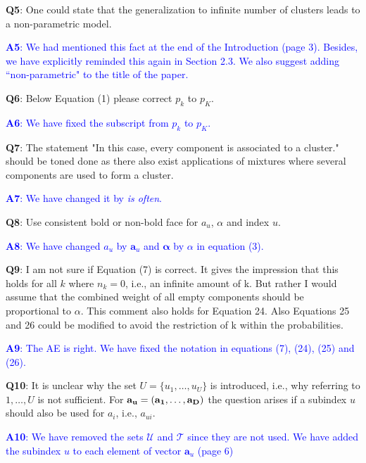 \documentclass[]{article}
\begin{document}
		\vspace{3mm}
	\textbf{Q5}:  One could state that the generalization to infinite number of clusters leads to a non-parametric model.

	\textcolor{blue}{  
	\textbf{A5}: We had mentioned this fact at the end of the Introduction (page 3). Besides, we have explicitly reminded this again in Section 2.3. We also suggest adding ``non-parametric" to the title of the paper.
	} 

		\vspace{3mm}
	\textbf{Q6}:  Below Equation (1) please correct $p_k$ to $p_K$.

	\textcolor{blue}{  
	\textbf{A6}: We have fixed the subscript from $p_k$ to $p_K$.
	} 

		\vspace{3mm}
	\textbf{Q7}:  The statement "In this case, every component is associated to a cluster." should be toned done as there also exist applications of mixtures where several components are used to form a cluster.
	
	\textcolor{blue}{  
	\textbf{A7}: We have changed it by \textit{is often}.
	} 
	
		\vspace{3mm}
	\textbf{Q8}:  Use consistent bold or non-bold face for $a_u$, $\alpha$ and index $u$.

	\textcolor{blue}{  
	\textbf{A8}: We have changed $a_u$ by $\mathbf{a}_u$ and $\boldsymbol{\alpha}$ by $\alpha$ in equation (3).
	} 
	
		\vspace{3mm}
	\textbf{Q9}: I am not sure if Equation (7) is correct. It gives the impression that this holds for all $k$ where $n_k = 0$, i.e., an infinite amount of k. But rather I would assume that the combined weight of all empty components should be proportional to $\alpha$. This comment also holds for Equation 24. Also Equations 25 and 26 could be modified to avoid the restriction of k within the probabilities.

	\textcolor{blue}{  
	\textbf{A9}: The AE is right. We have fixed the notation in equations (7), (24), (25) and (26).
	} 

	
	\vspace{3mm}
	\textbf{Q10}:  It is unclear why the set $U = \{u_1, \ldots, u_U\}$ is introduced, i.e., why referring to $1, \ldots, U$ is not sufficient. For $\bf{a}_u = (a_1, \ldots, a_D)$ the question arises if a subindex $u$ should also be used for $a_i$, i.e., $a_{ui}$.

	\textcolor{blue}{  
	\textbf{A10}: We have removed the sets $\mathcal{U}$ and $\mathcal{T}$ since they are not used. We have added the subindex $u$ to each element of vector $\mathbf{a}_u$ (page 6) 
	} 
	
\end{document}
